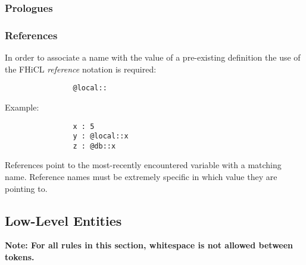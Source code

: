 \documentclass{memarticle}
\begin{document}
		\subsubsection{Prologues}
			
		\subsubsection{References}
			In order to associate a name
			with the value of a pre-existing definition 
			the use of the FHiCL \emph{reference} notation is required:
			\begin{verbatim}
				@local::
			\end{verbatim}
			Example:
			\begin{verbatim}
				x : 5
				y : @local::x
				z : @db::x
			\end{verbatim}
			\par
			References point to the most-recently encountered variable
			with a matching name.
			Reference names must be extremely specific
			in which value they are pointing to.
			
	\subsection{Low-Level Entities}
		\bf Note: \rm For all rules in this section,
		whitespace is not allowed between tokens.
\end{document}
